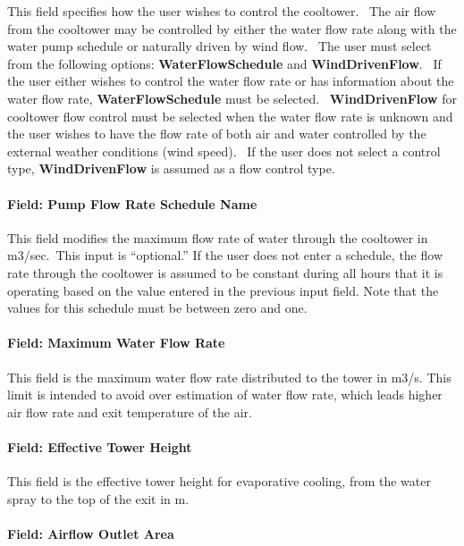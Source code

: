 This field specifies how the user wishes to control the cooltower.~ The air flow from the cooltower may be controlled by either the water flow rate along with the water pump schedule or naturally driven by wind flow.~ The user must select from the following options: \textbf{WaterFlowSchedule} and \textbf{WindDrivenFlow}.~ If the user either wishes to control the water flow rate or has information about the water flow rate, \textbf{WaterFlowSchedule} must be selected.~ \textbf{WindDrivenFlow} for cooltower flow control must be selected when the water flow rate is unknown and the user wishes to have the flow rate of both air and water controlled by the external weather conditions (wind speed).~ If the user does not select a control type, \textbf{WindDrivenFlow} is assumed as a flow control type.

\paragraph{Field: Pump Flow Rate Schedule Name}\label{field-pump-flow-rate-schedule-name}

This field modifies the maximum flow rate of water through the cooltower in m3/sec.~This input is ``optional.'' If the user does not enter a schedule, the flow rate through the cooltower is assumed to be constant during all hours that it is operating based on the value entered in the previous input field. Note that the values for this schedule must be between zero and one.

\paragraph{Field: Maximum Water Flow Rate}\label{field-maximum-water-flow-rate}

This field is the maximum water flow rate distributed to the tower in m3/s. This limit is intended to avoid over estimation of water flow rate, which leads higher air flow rate and exit temperature of the air.

\paragraph{Field: Effective Tower Height}\label{field-effective-tower-height}

This field is the effective tower height for evaporative cooling, from the water spray to the top of the exit in m.

\paragraph{Field: Airflow Outlet Area}\label{field-airflow-outlet-area}

